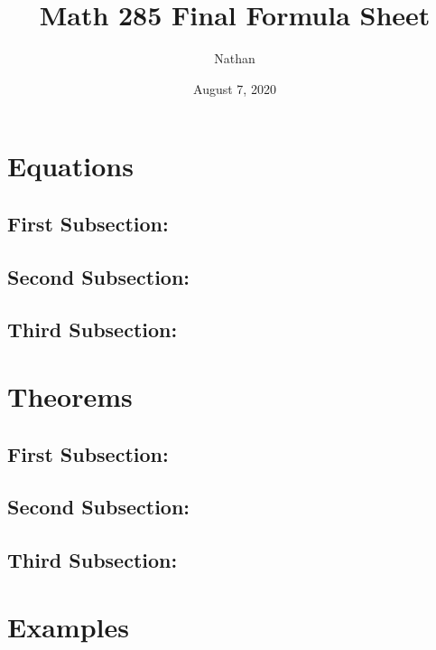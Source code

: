 \documentclass{article}
\title{Math 285 Final Formula Sheet}
\author{Nathan}
\date{August 7, 2020}
\begin{document}
\maketitle

\section*{Equations}

\subsection*{First Subsection:}
\setcounter{equation}{0}



\subsection*{Second Subsection:}
\setcounter{equation}{0}



\subsection*{Third Subsection:}
\setcounter{equation}{0}





\section*{Theorems}

\subsection*{First Subsection:}
\setcounter{equation}{0}



\subsection*{Second Subsection:}
\setcounter{equation}{0}



\subsection*{Third Subsection:}
\setcounter{equation}{0}





\section*{Examples}
\end{document}
